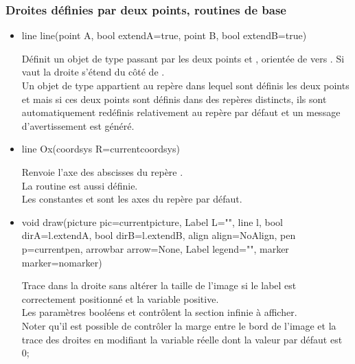 \documentclass[pdftex]{article}
\begin{document}
\subsubsection{Droites définies par deux points, routines de base}
\begin{itemize}
\item {}%
  \begin{Vcolor}
    line line(point A, bool extendA=true, point B, bool extendB=true)
  \end{Vcolor}
  Définit un objet de type  passant par les deux points
   et , orientée de  vers
  . Si  vaut  la \og{}droite\fg{}
  s'étend du côté de .\\
  Un objet de type  appartient au repère dans lequel sont
  définis les deux points  et  mais si ces
  deux points sont définis dans des repères
  distincts, ils sont automatiquement redéfinis relativement au repère
  par défaut et un message d'avertissement est généré.
\item {}%
  \begin{Vcolor}
    line Ox(coordsys R=currentcoordsys)
  \end{Vcolor}
  Renvoie l'axe des abscisses du repère .\\
  La routine
   est aussi
  définie.\\
  Les constantes  et  sont les axes du repère par défaut.
\item {}%
  \begin{Vcolor}
    void draw(picture pic=currentpicture, Label L="",
    line l, bool dirA=l.extendA, bool dirB=l.extendB,
    align align=NoAlign, pen p=currentpen,
    arrowbar arrow=None, Label legend="", marker marker=nomarker)
  \end{Vcolor}
  Trace dans  la \og{}droite\fg{}  sans altérer
  la taille de l'image si le label est correctement positionné et la
  variable  positive.\\
  Les paramètres booléens  et  contrôlent la
  section infinie à afficher.\\
  Noter qu'il est possible de contrôler la marge
  entre le bord de l'image et la trace des droites en modifiant la
  variable réelle  dont la valeur par défaut est 0;

\end{itemize}
\end{document}
